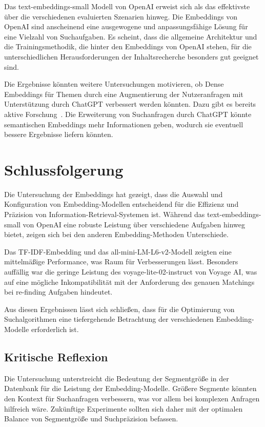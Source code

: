 Das text-embeddings-small Modell von OpenAI erweist sich als das effektivste über die verschiedenen evaluierten Szenarien hinweg. 
Die Embeddings von OpenAI sind anscheinend eine ausgewogene und anpassungsfähige Lösung für eine Vielzahl von Suchaufgaben. 
Es scheint, dass die allgemeine Architektur und die Trainingsmethodik, die hinter den Embeddings von OpenAI stehen, für die unterschiedlichen Herausforderungen der Inhaltsrecherche besonders gut geeignet sind.

Die Ergebnisse könnten weitere Untersuchungen motivieren, ob Dense Embeddings für Themen durch eine Augmentierung der Nutzeranfragen mit Unterstützung durch ChatGPT verbessert werden könnten. Dazu gibt es bereits aktive Forschung~\cite{shum2024}\cite{dai2023}. 
Die Erweiterung von Suchanfragen durch ChatGPT könnte semantischen Embeddings mehr Informationen geben, wodurch sie eventuell bessere Ergebnisse liefern könnten.


\section{Schlussfolgerung}

Die Untersuchung der Embeddings hat gezeigt, dass die Auswahl und Konfiguration von Embedding-Modellen entscheidend für die Effizienz und Präzision von Information-Retrieval-Systemen ist. 
Während das text-embeddings-small von OpenAI eine robuste Leistung über verschiedene Aufgaben hinweg bietet, zeigen sich bei den anderen Embedding-Methoden Unterschiede.

Das TF-IDF-Embedding und das all-mini-LM-L6-v2-Modell zeigten eine mittelmäßige Performance, was Raum für Verbesserungen lässt. 
Besonders auffällig war die geringe Leistung des voyage-lite-02-instruct von Voyage AI, was auf eine mögliche Inkompatibilität mit der Anforderung des genauen Matchings bei re-finding Aufgaben hindeutet.

Aus diesen Ergebnissen lässt sich schließen, dass für die Optimierung von Suchalgorithmen eine tiefergehende Betrachtung der verschiedenen Embedding-Modelle erforderlich ist.

\subsection{Kritische Reflexion}

Die Untersuchung unterstreicht die Bedeutung der Segmentgröße in der Datenbank für die Leistung der Embedding-Modelle. 
Größere Segmente könnten den Kontext für Suchanfragen verbessern, was vor allem bei komplexen Anfragen hilfreich wäre. 
Zukünftige Experimente sollten sich daher mit der optimalen Balance von Segmentgröße und Suchpräzision befassen.

